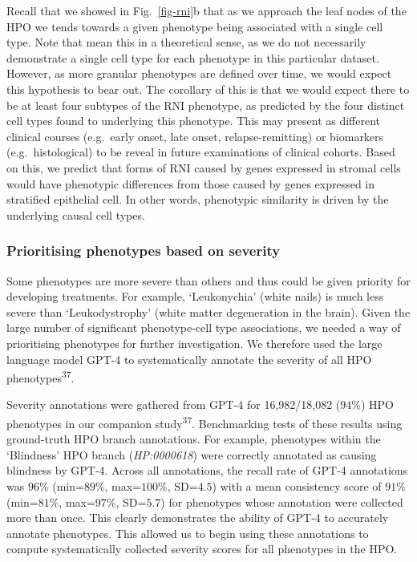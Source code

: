 \documentclass[
]{article}
\begin{document}
Recall that we showed in Fig.~\ref{fig-rni}b that as we approach the
leaf nodes of the HPO we tends towards a given phenotype being
associated with a single cell type. Note that mean this in a theoretical
sense, as we do not necessarily demonstrate a single cell type for each
phenotype in this particular dataset. However, as more granular
phenotypes are defined over time, we would expect this hypothesis to
bear out. The corollary of this is that we would expect there to be at
least four subtypes of the RNI phenotype, as predicted by the four
distinct cell types found to underlying this phenotype. This may present
as different clinical courses (e.g.~early onset, late onset,
relapse-remitting) or biomarkers (e.g.~histological) to be reveal in
future examinations of clinical cohorts. Based on this, we predict that
forms of RNI caused by genes expressed in stromal cells would have
phenotypic differences from those caused by genes expressed in
stratified epithelial cell. In other words, phenotypic similarity is
driven by the underlying causal cell types.

\subsubsection{Prioritising phenotypes based on
severity}\label{prioritising-phenotypes-based-on-severity}

Some phenotypes are more severe than others and thus could be given
priority for developing treatments. For example, `Leukonychia' (white
nails) is much less severe than `Leukodystrophy' (white matter
degeneration in the brain). Given the large number of significant
phenotype-cell type associations, we needed a way of prioritising
phenotypes for further investigation. We therefore used the large
language model GPT-4 to systematically annotate the severity of all HPO
phenotypes\textsuperscript{37}.

Severity annotations were gathered from GPT-4 for 16,982/18,082
(\(94\)\%) HPO phenotypes in our companion study\textsuperscript{37}.
Benchmarking tests of these results using ground-truth HPO branch
annotations. For example, phenotypes within the `Blindness' HPO branch
(\emph{HP:0000618}) were correctly annotated as causing blindness by
GPT-4. Across all annotations, the recall rate of GPT-4 annotations was
\(96\)\% (min=\(89\)\%, max=\(100\)\%, SD=\(4.5\)) with a mean
consistency score of \(91\)\% (min=\(81\)\%, max=\(97\)\%, SD=\(5.7\))
for phenotypes whose annotation were collected more than once. This
clearly demonstrates the ability of GPT-4 to accurately annotate
phenotypes. This allowed us to begin using these annotations to compute
systematically collected severity scores for all phenotypes in the HPO.
\end{document}
